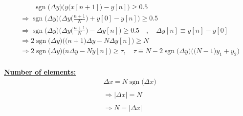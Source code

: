 \documentclass{article}
\DeclareMathOperator{\sgn}{sgn}
\begin{document}
\begin{align*}
    &\quad \quad \sgn\big(\Delta y\big)\Big(y\big(x[n + 1]\big) - y[n]\Big) \geq 0.5 \\
    &\Rightarrow \sgn\big(\Delta y\big)\Bigg(\Delta y\bigg(\frac{n + 1}{N}\bigg) + y[0] - y[n]\Bigg) \geq 0.5 \\
    &\Rightarrow \sgn\big(\Delta y\big)\Bigg(\Delta y\bigg(\frac{n + 1}{N}\bigg) - \Delta y[n]\Bigg) \geq 0.5 \quad, \quad \Delta y[n] \equiv y[n] - y[0] \\ 
    &\Rightarrow 2\sgn\big(\Delta y\big)\Bigg(\big(n + 1\big)\Delta y - N\Delta y[n]\Bigg) \geq N \\
    &\Rightarrow 2\sgn\big(\Delta y\big)\Bigg(n\Delta y - Ny[n] \Bigg) \geq \tau, \quad \tau \equiv N - 2\sgn\big(\Delta y\big)\bigg(\big(N - 1\big)y_{1} + y_{2}\bigg) \\
\end{align*}

\underline{\textbf{Number of elements:}}
\begin{align*}
    &\Delta x = N\sgn\big(\Delta x\big) \\ \\
    &\Rightarrow |\Delta x| = N \\ \\
    &\Rightarrow N = |\Delta x| 
\end{align*}
\end{document}
